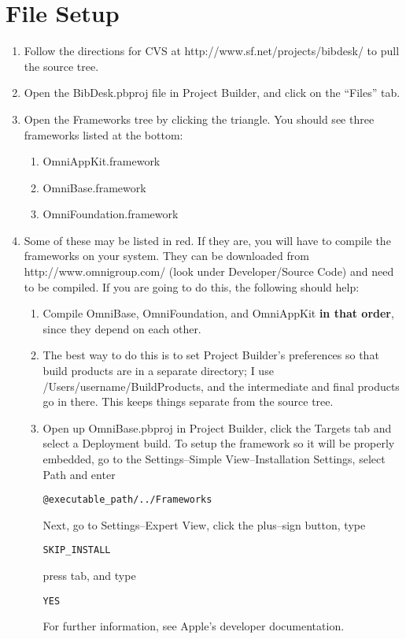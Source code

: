 \documentclass[11pt]{article}
\begin{document}
\section{File Setup}
\begin{enumerate}
\item Follow the directions for CVS at http://www.sf.net/projects/bibdesk/ to pull the source tree.
\item Open the BibDesk.pbproj file in Project Builder, and click on the ``Files'' tab.
\item Open the Frameworks tree by clicking the triangle.  You should see three frameworks listed at
the bottom:
  \begin{enumerate}
  \item OmniAppKit.framework
  \item OmniBase.framework
  \item OmniFoundation.framework
  \end{enumerate}
\item Some of these may be listed in red.  If they are, you will have to compile the frameworks on
your system.  They can be downloaded from http://www.omnigroup.com/ (look under Developer/Source
Code) and need to be compiled.  If you are going to do this, the following should help:
  \begin{enumerate}
  \item Compile OmniBase, OmniFoundation, and OmniAppKit \textbf{in that order}, since
they depend on each other.
  \item The best way to do this is to set Project Builder's preferences so that build products are in
a separate directory; I use /Users/username/BuildProducts, and the intermediate and final products
go in there.  This keeps things separate from the source tree.
  \item Open up OmniBase.pbproj in Project Builder, click the Targets tab and select a Deployment
build.  To setup the framework so it will be properly embedded, go to the Settings--Simple
View--Installation Settings, select Path and enter
\begin{verbatim}@executable_path/../Frameworks\end{verbatim}  Next, go to Settings--Expert View,
click the plus--sign button, type \begin{verbatim}SKIP_INSTALL\end{verbatim} press tab, and type
\begin{verbatim}YES\end{verbatim}
For further information, see Apple's developer documentation.

\end{enumerate}
\end{enumerate}
\end{document}
